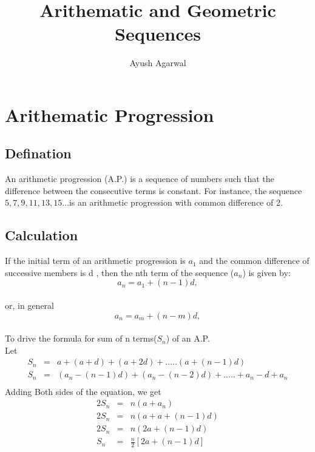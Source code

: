 \documentclass[a4paper,10pt]{article}
\title{Arithematic and Geometric Sequences}
\author{Ayush Agarwal}
\date{}
\begin{document}
\maketitle


\section{Arithematic Progression}
\subsection*{Defination}
An arithmetic progression (A.P.) is a sequence of numbers such that the difference between the consecutive terms is constant. 
For instance, the sequence $5, 7, 9, 11, 13, 15 … $is an arithmetic progression with common difference of 2.\\

\subsection*{Calculation}
If the initial term of an arithmetic progression is $a_1$ and the common difference of successive members is d
, then the nth term of the sequence ($a_n$) is given by:\\
\vspace{2mm}
 $$a_n = a_1 + (n - 1)d,$$\\
 or, in general
 $$a_n = a_m + (n - m)d,$$\\
To drive the formula for sum of n terms($S_n$) of an A.P.\\
Let \\
\begin{eqnarray*}
S_n&=& a + (a + d) + (a + 2d) + ..... (a + (n - 1)d)\\
S_n&=&(a_n - (n - 1)d) + (a_n - (n - 2)d) + ..... + a_n - d + a_n\\
\end{eqnarray*}
\textrm Adding Both sides of the equation, we get\\
\begin{eqnarray*}
2S_n&=& n(a + a_n)\\
2S_n&=& n(a + a + (n - 1)d) \\
2S_n&=& n(2a + (n - 1)d) \\
S_n&=& \frac{n}{2}[2a + (n - 1)d] \\
\end{eqnarray*} 
\end{document}
